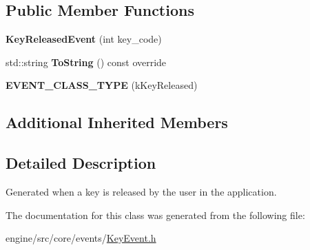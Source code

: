 \subsection*{Public Member Functions}
\begin{DoxyCompactItemize}
\item 
\mbox{\label{classengine_1_1events_1_1KeyReleasedEvent_a6e5c52cc5adcfa7f9afd36557125b1d5}} 
{\bfseries Key\+Released\+Event} (int key\+\_\+code)
\item 
\mbox{\label{classengine_1_1events_1_1KeyReleasedEvent_a7b7e3848f31974623a24708aafdc9d69}} 
std\+::string {\bfseries To\+String} () const override
\item 
\mbox{\label{classengine_1_1events_1_1KeyReleasedEvent_ae97c5e54e75492b5da5146bbff61123d}} 
{\bfseries E\+V\+E\+N\+T\+\_\+\+C\+L\+A\+S\+S\+\_\+\+T\+Y\+PE} (k\+Key\+Released)
\end{DoxyCompactItemize}
\subsection*{Additional Inherited Members}


\subsection{Detailed Description}
Generated when a key is released by the user in the application. 

The documentation for this class was generated from the following file\+:\begin{DoxyCompactItemize}
\item 
engine/src/core/events/\hyperlink{KeyEvent_8h}{Key\+Event.\+h}\end{DoxyCompactItemize}
